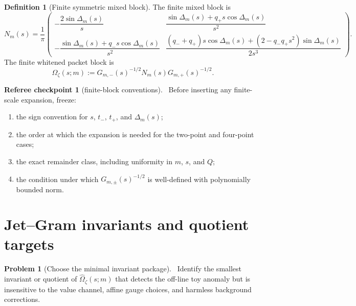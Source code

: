 \documentclass[11pt,a4paper]{amsart}
\newcommand{\Status}[1]{\textnormal{\fbox{\scriptsize\textsf{#1}}}}
\newcommand{\Core}{\Status{CORE}}
\newcommand{\Open}{\Status{OPEN}}
\newcommand{\Scale}{Q}
\theoremstyle{plain}
\theoremstyle{definition}
\newtheorem{definition}[theorem]{Definition}
\newtheorem{problem}[theorem]{Problem}
\newtheorem{checkpoint}[theorem]{Referee checkpoint}
\begin{document}
\begin{definition}[Finite symmetric mixed block]
\label{def:finite-symmetric-mixed-block}
The finite mixed block is
\begin{equation}
\label{eq:Nm}
N_m(s)=\frac1\pi
\begin{pmatrix}
-\dfrac{2\sin\Delta_m(s)}{s}
&
\dfrac{\sin\Delta_m(s)+q_+s\cos\Delta_m(s)}{s^2}
\\[2ex]
-\dfrac{\sin\Delta_m(s)+q_-s\cos\Delta_m(s)}{s^2}
&
\dfrac{(q_-+q_+)s\cos\Delta_m(s)+(2-q_-q_+s^2)\sin\Delta_m(s)}{2s^3}
\end{pmatrix}.
\end{equation}
The finite whitened packet block is
\begin{equation}
\label{eq:omega-finite}
\widehat\Omega_\zeta(s;m):=G_{m,-}(s)^{-1/2}N_m(s)G_{m,+}(s)^{-1/2}.
\end{equation}
\end{definition}

\begin{checkpoint}[finite-block conventions]
\label{chk:finite-block-conventions}
\Core\
Before inserting any finite-scale expansion, freeze:
\begin{enumerate}[label=\textup{F\arabic*.},leftmargin=*]
\item the sign convention for \(s\), \(t_-\), \(t_+\), and \(\Delta_m(s)\);
\item the order at which the expansion is needed for the two-point and four-point cases;
\item the exact remainder class, including uniformity in \(m\), \(s\), and \(\Scale\);
\item the condition under which \(G_{m,\pm}(s)^{-1/2}\) is well-defined with polynomially bounded norm.
\end{enumerate}
\end{checkpoint}

\section{Jet--Gram invariants and quotient targets}
\label{sec:jetgram-invariants-quotient-targets}

\begin{problem}[Choose the minimal invariant package]
\label{prob:minimal-invariant-package}
\Open\
Identify the smallest invariant or quotient of \(\widehat\Omega_\zeta(s;m)\) that detects the off-line toy anomaly but is insensitive to the value channel, affine gauge choices, and harmless background corrections.
\end{problem}
\end{document}
